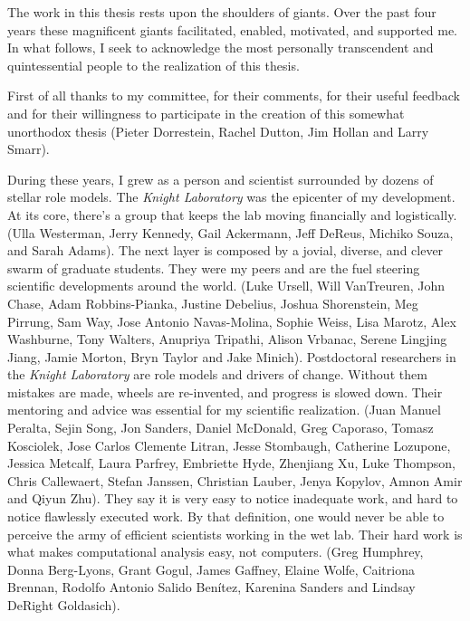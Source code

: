 \begin{frontmatter}
\begin{acknowledgements}
    The work in this thesis rests upon the shoulders of giants. Over the past 
    four years these magnificent giants facilitated, enabled, motivated, and 
    supported me.  In what follows, I seek to acknowledge the most personally 
    transcendent and quintessential people to the realization of this thesis.

    First of all thanks to my committee, for their comments, for their useful
    feedback and for their willingness to participate in the creation of this
    somewhat unorthodox thesis (Pieter Dorrestein, Rachel Dutton, Jim Hollan 
    and Larry Smarr).

    During these years, I grew as a person and scientist surrounded by dozens 
    of stellar role models. The \textit{Knight Laboratory} was the epicenter of 
    my development. At its core, there's a group that keeps the lab moving 
    financially and logistically. (Ulla Westerman, Jerry Kennedy, Gail 
    Ackermann, Jeff DeReus, Michiko Souza, and Sarah Adams). The next layer is 
    composed by a jovial, diverse, and clever swarm of graduate students.  They 
    were my peers and are the fuel steering scientific developments around the 
    world. (Luke Ursell, Will VanTreuren, John Chase, Adam Robbins-Pianka, 
    Justine Debelius, Joshua Shorenstein, Meg Pirrung, Sam Way, Jose Antonio 
    Navas-Molina, Sophie Weiss, Lisa Marotz, Alex Washburne, Tony Walters, 
    Anupriya Tripathi, Alison Vrbanac, Serene Lingjing Jiang, Jamie Morton, 
    Bryn Taylor and Jake Minich). Postdoctoral researchers in the 
    \textit{Knight Laboratory} are role models and drivers of change. Without 
    them mistakes are made, wheels are re-invented, and progress is slowed 
    down. Their mentoring and advice was essential for my scientific 
    realization. (Juan Manuel Peralta, Sejin Song, Jon Sanders, Daniel 
    McDonald, Greg Caporaso, Tomasz Kosciolek, Jose Carlos Clemente Litran, 
    Jesse Stombaugh, Catherine Lozupone, Jessica Metcalf, Laura Parfrey, 
    Embriette Hyde, Zhenjiang Xu, Luke Thompson, Chris Callewaert, Stefan 
    Janssen, Christian Lauber, Jenya Kopylov, Amnon Amir and Qiyun Zhu).  They 
    say it is very easy to notice inadequate work, and hard to notice 
    flawlessly executed work. By that definition, one would never be able to 
    perceive the army of efficient scientists working in the wet lab.  Their 
    hard work is what makes computational analysis easy, not computers.  (Greg 
    Humphrey, Donna Berg-Lyons, Grant Gogul, James Gaffney, Elaine Wolfe, 
    Caitriona Brennan, Rodolfo Antonio Salido Ben\'itez, Karenina Sanders and 
    Lindsay DeRight Goldasich).


\end{acknowledgements}
\end{frontmatter}
